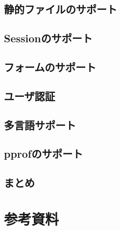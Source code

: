 \subsection{静的ファイルのサポート}

\subsection{Sessionのサポート}

\subsection{フォームのサポート}

\subsection{ユーザ認証}

\subsection{多言語サポート}

\subsection{pprofのサポート}

\subsection{まとめ}


\section{参考資料}

